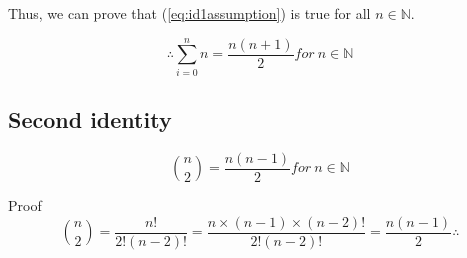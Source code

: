 \documentclass[a4paper,11pt]{article}
\begin{document}
Thus, we can prove that (\ref{eq:id1assumption}) is true for all $n \in \mathbb{N}$.

$$\therefore \sum_{i=0}^nn = \frac{n(n+1)}{2} for\ n \in \mathbb{N}$$

\subsection{Second identity}

$$\binom{n}{2} = \frac{n(n-1)}{2} for\ n \in \mathbb{N}$$

Proof
$$\binom{n}{2} = \frac{n!}{2!(n-2)!} = \frac{n \times (n-1) \times (n-2)!}{2!(n-2)!} = \frac{n(n-1)}{2} \therefore$$
\end{document}

